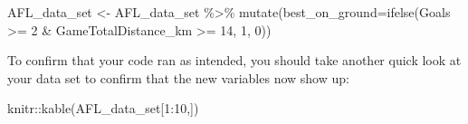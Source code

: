 \documentclass[
]{article}
\newenvironment{Shaded}{\begin{snugshade}}{\end{snugshade}}
\newcommand{\AttributeTok}[1]{\textcolor[rgb]{0.77,0.63,0.00}{#1}}
\newcommand{\DecValTok}[1]{\textcolor[rgb]{0.00,0.00,0.81}{#1}}
\newcommand{\FunctionTok}[1]{\textcolor[rgb]{0.00,0.00,0.00}{#1}}
\newcommand{\NormalTok}[1]{#1}
\newcommand{\OtherTok}[1]{\textcolor[rgb]{0.56,0.35,0.01}{#1}}
\newcommand{\SpecialCharTok}[1]{\textcolor[rgb]{0.00,0.00,0.00}{#1}}
\begin{document}
\begin{Shaded}
\begin{Highlighting}[]
\NormalTok{AFL\_data\_set }\OtherTok{\textless{}{-}}\NormalTok{ AFL\_data\_set }\SpecialCharTok{\%\textgreater{}\%}
  \FunctionTok{mutate}\NormalTok{(}\AttributeTok{best\_on\_ground=}\FunctionTok{ifelse}\NormalTok{(Goals }\SpecialCharTok{\textgreater{}=} \DecValTok{2} \SpecialCharTok{\&}\NormalTok{ GameTotalDistance\_km }\SpecialCharTok{\textgreater{}=} \DecValTok{14}\NormalTok{, }\DecValTok{1}\NormalTok{, }\DecValTok{0}\NormalTok{))}
\end{Highlighting}
\end{Shaded}

To confirm that your code ran as intended, you should take another quick
look at your data set to confirm that the new variables now show up:

\begin{Shaded}
\begin{Highlighting}[]
\NormalTok{knitr}\SpecialCharTok{::}\FunctionTok{kable}\NormalTok{(AFL\_data\_set[}\DecValTok{1}\SpecialCharTok{:}\DecValTok{10}\NormalTok{,])}
\end{Highlighting}
\end{Shaded}
\end{document}
